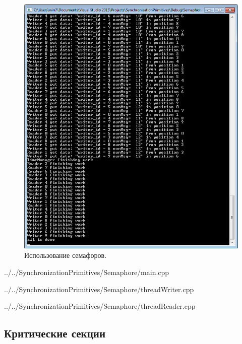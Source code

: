 \documentclass[a4paper, 12pt]{article}		%
\begin{document}
\begin{figure}[h!]
\centering
\includegraphics[scale=1]{res/002}
\caption{Использование семафоров.}
\end{figure}


{../../SynchronizationPrimitives/Semaphore/main.cpp}


{../../SynchronizationPrimitives/Semaphore/threadWriter.cpp}


{../../SynchronizationPrimitives/Semaphore/threadReader.cpp}

\newpage
\subsection{Критические секции}
\end{document}
